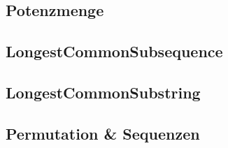 \documentclass[10pt,a4paper,ngerman]{article}
\begin{document}
\subsection{Potenzmenge}

\subsection{LongestCommonSubsequence}

\subsection{LongestCommonSubstring}

\subsection{Permutation \& Sequenzen}

\end{document}
